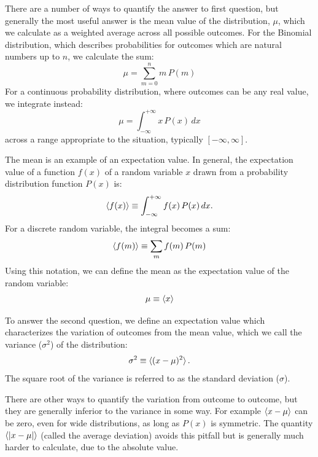 \documentclass[12pt]{book}
\begin{document}
There are a number of ways to quantify the answer to first question,
but generally the most useful answer is the mean value of the
distribution, $\mu$, which we calculate as a weighted average across
all possible outcomes.  For the Binomial distribution, which describes
probabilities for outcomes which are natural numbers up to $n$, we
calculate the sum:
\begin{equation}
\label{eqn:mudis}
\mu = \sum_{m=0}^{n} m \, P(m)
\end{equation}
For a continuous probability distribution, where outcomes can be any
real value, we integrate instead:
\begin{equation}
\mu = \int_{-\infty}^{+\infty} x \, P(x) \, dx 
\end{equation}
across a range appropriate to the situation, typically $[-\infty,\infty]$.

The mean is an example of an expectation value.  In general, the
expectation value of a function $f(x)$ of a random variable $x$ drawn
from a probability distribution function $P(x)$ is:
\begin{displaymath}
\braket{f(x)} \equiv \int_{-\infty}^{+\infty} f(x) \, P(x) \,dx.
\end{displaymath}
For a discrete random variable, the integral becomes a sum:
\begin{displaymath}
\braket{f(m)} \equiv \sum_m f(m) \, P(m) 
\end{displaymath}
Using this notation, we can define the mean as the
expectation value of the random variable:
\begin{displaymath}
\mu \equiv \braket{x}
\end{displaymath}

To answer the second question, we define an expectation value
which characterizes the variation of outcomes from the mean value,
which we call the variance ($\sigma^2$) of the distribution:
\begin{displaymath}
\sigma^2 \equiv \braket{(x-\mu)^2}.
\end{displaymath}
The square root of the variance is referred to as the
standard deviation ($\sigma$).

There are other ways to quantify the variation from outcome to
outcome, but they are generally inferior to the variance in some way.
For example $\braket{x-\mu}$ can be zero, even for wide distributions,
as long as $P(x)$ is symmetric.  The quantity $\braket{|x-\mu|}$
(called the average deviation) avoids this pitfall but is generally
much harder to calculate, due to the absolute value.
\end{document}
